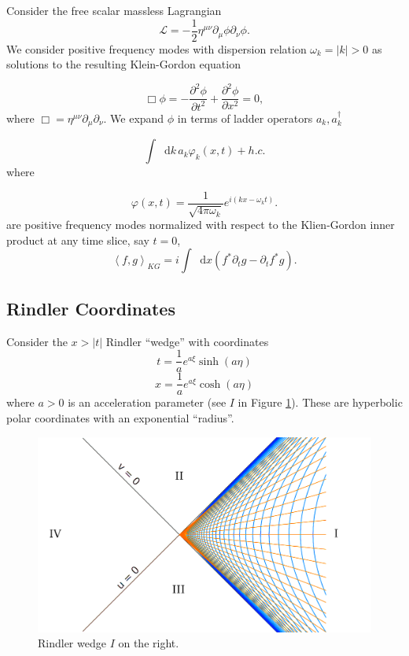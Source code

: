 \documentclass[12pt,a4paper]{article}
\newcommand*\diff{\mathop{}\!\mathrm{d}}
\begin{document}
Consider the free scalar massless Lagrangian
\begin{equation}
\mathscr{L} = -\frac{1}{2} \eta^{\mu\nu}\partial_\mu \phi \partial_\nu \phi.
\end{equation}
We consider positive frequency modes with dispersion relation $\omega_k = |k| > 0$ as solutions to the resulting Klein-Gordon equation 

\begin{equation}
  \Box \phi = -\frac{\partial^2 \phi}{\partial t^2} + \frac{\partial^2 \phi}{\partial x^2} = 0,
 \label{massless-wave-eq}
\end{equation}
where $\Box = \eta^{\mu\nu} \partial_\mu \partial_\nu$. We expand $\phi$ in terms of ladder operators $a_k, a_k^\dagger$

\begin{equation}
  \int \diff k \, a_k \varphi_k(x,t) + h.c.
\end{equation}
where

\begin{equation}
  \varphi(x,t) = \frac{1}{\sqrt{4\pi\omega_k}} e^{i(kx - \omega_k t)}.
\label{amode}
\end{equation}
are positive frequency modes normalized with respect to the Klien-Gordon inner product at any time slice, say $t = 0$,
\begin{equation}
  \left<f, g\right>_{KG} = i \int \diff x (f^* \partial_t g - \partial_t f^* g).
\end{equation}

\subsection{Rindler Coordinates}

Consider the $x>|t|$ Rindler ``wedge'' with coordinates
\begin{equation}
  t = \frac{1}{a}e^{a\xi}\sinh{(a\eta)}
\label{sinh}
\end{equation}
\begin{equation}
x = \frac{1}{a}e^{a\xi}\cosh{(a\eta)}
\end{equation}
where $a>0$ is an acceleration parameter (see $I$ in Figure \ref{rindlerw}). These are hyperbolic polar coordinates with an exponential ``radius''.

\begin{figure}[h]
\centering
\includegraphics[scale=0.4]{rindler_w.png}
\caption{Rindler wedge $I$ on the right.}
\label{rindlerw}
\end{figure}
\end{document}
